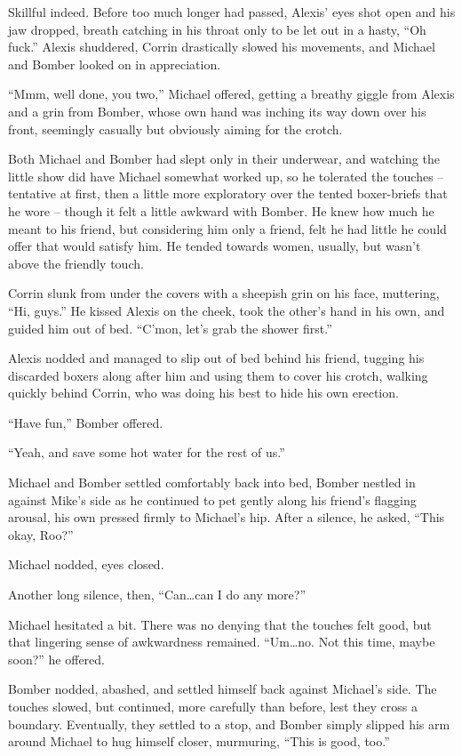 Skillful indeed. Before too much longer had passed, Alexis' eyes shot open and his jaw dropped, breath catching in his throat only to be let out in a hasty, ``Oh fuck.'' Alexis shuddered, Corrin drastically slowed his movements, and Michael and Bomber looked on in appreciation.

``Mmm, well done, you two,'' Michael offered, getting a breathy giggle from Alexis and a grin from Bomber, whose own hand was inching its way down over his front, seemingly casually but obviously aiming for the crotch.

Both Michael and Bomber had slept only in their underwear, and watching the little show did have Michael somewhat worked up, so he tolerated the touches -- tentative at first, then a little more exploratory over the tented boxer-briefs that he wore -- though it felt a little awkward with Bomber. He knew how much he meant to his friend, but considering him only a friend, felt he had little he could offer that would satisfy him. He tended towards women, usually, but wasn't above the friendly touch.

Corrin slunk from under the covers with a sheepish grin on his face, muttering, ``Hi, guys.'' He kissed Alexis on the cheek, took the other's hand in his own, and guided him out of bed. ``C'mon, let's grab the shower first.''

Alexis nodded and managed to slip out of bed behind his friend, tugging his discarded boxers along after him and using them to cover his crotch, walking quickly behind Corrin, who was doing his best to hide his own erection.

``Have fun,'' Bomber offered.

``Yeah, and save some hot water for the rest of us.''

Michael and Bomber settled comfortably back into bed, Bomber nestled in against Mike's side as he continued to pet gently along his friend's flagging arousal, his own pressed firmly to Michael's hip. After a silence, he asked, ``This okay, Roo?''

Michael nodded, eyes closed.

Another long silence, then, ``Can\ldots{}can I do any more?''

Michael hesitated a bit. There was no denying that the touches felt good, but that lingering sense of awkwardness remained. ``Um\ldots{}no. Not this time, maybe soon?'' he offered.

Bomber nodded, abashed, and settled himself back against Michael's side. The touches slowed, but continued, more carefully than before, lest they cross a boundary. Eventually, they settled to a stop, and Bomber simply slipped his arm around Michael to hug himself closer, murmuring, ``This is good, too.''

